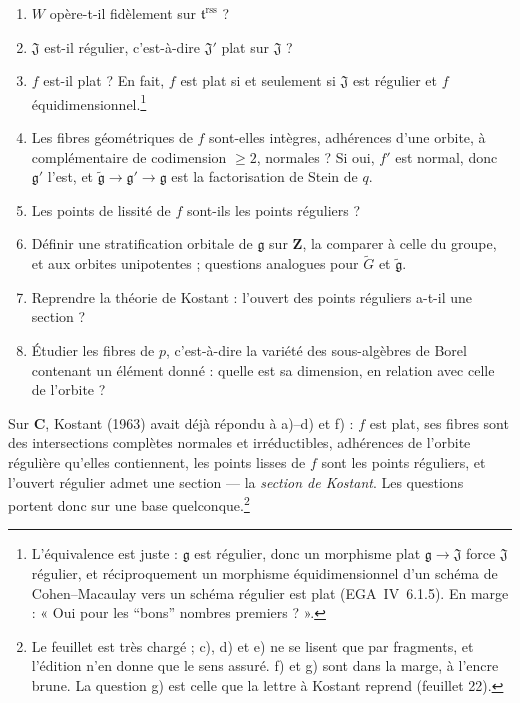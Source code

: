 \documentclass[11pt,a4paper]{article}
\begin{document}
\begin{enumerate}
\item[0)] $W$ opère-t-il fidèlement sur $\mathfrak{t}^{\mathrm{rss}}$ ?
\item[a)] $\mathfrak{J}$ est-il régulier, c'est-à-dire $\mathfrak{J}'$ plat
  sur $\mathfrak{J}$ ?
\item[b)] $f$ est-il plat ? En fait, $f$ est plat si et seulement si
  $\mathfrak{J}$ est régulier et $f$ équidimensionnel.\footnote{L'équivalence
  est juste : $\mathfrak{g}$ est régulier, donc un morphisme plat
  $\mathfrak{g}\to\mathfrak{J}$ force $\mathfrak{J}$ régulier, et
  réciproquement un morphisme équidimensionnel d'un schéma de Cohen--Macaulay
  vers un schéma régulier est plat (EGA~IV~6.1.5). En marge : « Oui pour les
  “bons” nombres premiers ? ».}
\item[c)] Les fibres géométriques de $f$ sont-elles intègres, adhérences
  d'une orbite, à complémentaire de codimension $\geqslant 2$, normales ? Si
  oui, $f'$ est normal, donc $\mathfrak{g}'$ l'est, et
  $\widetilde{\mathfrak{g}}\to\mathfrak{g}'\to\mathfrak{g}$ est la
  factorisation de Stein de $q$.
\item[d)] Les points de lissité de $f$ sont-ils les points réguliers ?
\item[e)] Définir une stratification orbitale de $\mathfrak{g}$ sur
  $\mathbf{Z}$, la comparer à celle du groupe, et aux orbites unipotentes ;
  questions analogues pour $\widetilde{G}$ et $\widetilde{\mathfrak{g}}$.
\item[f)] Reprendre la théorie de Kostant : l'ouvert des points réguliers
  a-t-il une section ?
\item[g)] Étudier les fibres de $p$, c'est-à-dire la variété des
  sous-algèbres de Borel contenant un élément donné : quelle est sa dimension,
  en relation avec celle de l'orbite ?
\end{enumerate}

Sur $\mathbf{C}$, Kostant (1963) avait déjà répondu à a)--d) et f) : $f$ est
plat, ses fibres sont des intersections complètes normales et irréductibles,
adhérences de l'orbite régulière qu'elles contiennent, les points lisses de $f$
sont les points réguliers, et l'ouvert régulier admet une section — la
\emph{section de Kostant}. Les questions portent donc sur une base
quelconque.\footnote{Le feuillet est très chargé ; c), d) et e) ne se lisent que
par fragments, et l'édition n'en donne que le sens assuré. f) et g) sont dans
la marge, à l'encre brune. La question g) est celle que la lettre à Kostant
reprend (feuillet 22).}
\end{document}
